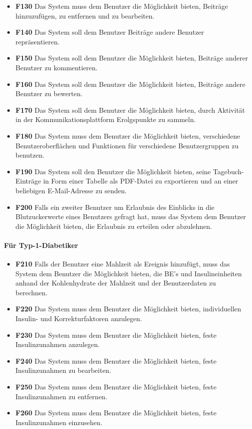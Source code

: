 \begin{itemize}
		\item\textbf{\lbrack F130\rbrack} Das System muss dem Benutzer die Möglichkeit bieten, Beiträge hinzuzufügen, zu entfernen und zu bearbeiten.
		\item\textbf{\lbrack F140\rbrack} Das System soll dem Benutzer Beiträge andere Benutzer repräsentieren.
		\item\textbf{\lbrack F150\rbrack} Das System soll dem Benutzer die Möglichkeit bieten, Beiträge anderer Benutzer zu kommentieren.
		\item\textbf{\lbrack F160\rbrack} Das System soll dem Benutzer die Möglichkeit bieten, Beiträge andere Benutzer zu bewerten.
		\item\textbf{\lbrack F170\rbrack} Das System soll dem Benutzer die Möglichkeit bieten, durch Aktivität in der Kommunikationsplattform Erolgspunkte zu sammeln.
		\item\textbf{\lbrack F180\rbrack} Das System muss dem Benutzer die Möglichkeit bieten, verschiedene Benutzeroberflächen und Funktionen für verschiedene Benutzergruppen zu benutzen.
		\item\textbf{\lbrack F190\rbrack} Das System soll den Benutzer die Möglichkeit bieten, seine Tagebuch-Einträge in Form einer Tabelle als PDF-Datei zu exportieren und an einer beliebigen E-Mail-Adresse zu senden.
		\item\textbf{\lbrack F200\rbrack} Falls ein zweiter Benutzer um Erlaubnis des Einblicks in die Blutzuckerwerte eines Benutzers gefragt hat, muss das System dem Benutzer die Möglichkeit bieten, die Erlaubnis zu erteilen oder abzulehnen.
	\end{itemize}
	\paragraph{Für Typ-1-Diabetiker}\mbox{}
	\begin{itemize}
		\item\textbf{\lbrack F210\rbrack} Falls der Benutzer eine Mahlzeit als Ereignis hinzufügt, muss das System dem Benutzer die Möglichkeit bieten, die BE's und Insulineinheiten anhand der Kohlenhydrate der Mahlzeit und der Benutzerdaten zu berechnen.
		\item\textbf{\lbrack F220\rbrack} Das System muss dem Benutzer die Möglichkeit bieten, individuellen Insulin- und Korrekturfaktoren anzulegen.
		\item\textbf{\lbrack F230\rbrack} Das System muss dem Benutzer die Möglichkeit bieten, feste Insulinzunahmen anzulegen.
		\item\textbf{\lbrack F240\rbrack} Das System muss dem Benutzer die Möglichkeit bieten, feste Insulinzunahmen zu bearbeiten.
		\item\textbf{\lbrack F250\rbrack} Das System muss dem Benutzer die Möglichkeit bieten, feste Insulinzunahmen zu entfernen.
		\item\textbf{\lbrack F260\rbrack} Das System muss dem Benutzer die Möglichkeit bieten, feste Insulinzunahmen einzusehen.
	\end{itemize}
